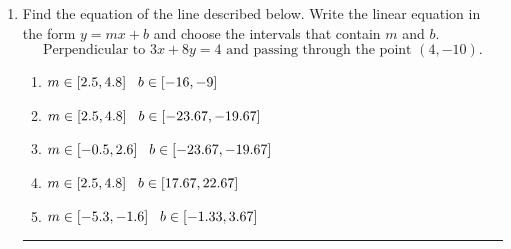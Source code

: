 \documentclass[14pt]{extbook}
\newcommand{\litem}[1]{\item#1\hspace*{-1cm}\rule{\textwidth}{0.4pt}}
\begin{document}
\begin{enumerate}
{\begin{enumerate}[label=\Alph*.]
\end{enumerate} }
\litem{
Find the equation of the line described below. Write the linear equation in the form $ y=mx+b $ and choose the intervals that contain $m$ and $b$.\[ \text{Perpendicular to } 3 x + 8 y = 4 \text{ and passing through the point } (4, -10). \]\begin{enumerate}[label=\Alph*.]
\item \( m \in [2.5, 4.8] \hspace*{3mm} b \in [-16, -9] \)
\item \( m \in [2.5, 4.8] \hspace*{3mm} b \in [-23.67, -19.67] \)
\item \( m \in [-0.5, 2.6] \hspace*{3mm} b \in [-23.67, -19.67] \)
\item \( m \in [2.5, 4.8] \hspace*{3mm} b \in [17.67, 22.67] \)
\item \( m \in [-5.3, -1.6] \hspace*{3mm} b \in [-1.33, 3.67] \)

\end{enumerate} }
\end{enumerate}
\end{document}
